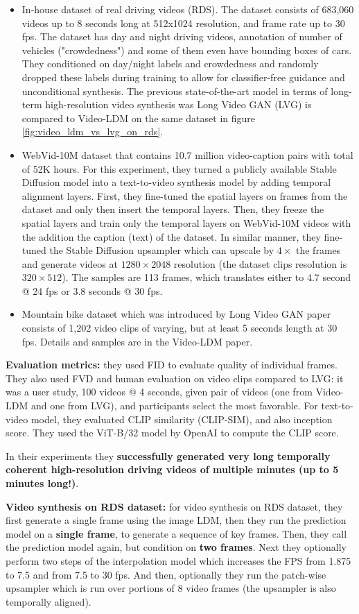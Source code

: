 \begin{itemize}
    \item In-house dataset of real driving videos (RDS). The dataset consists of 683,060 videos up to 8 seconds long at 512x1024 resolution, and frame rate up to 30 fps. The dataset has day and night driving videos, annotation of number of vehicles ("crowdedness") and some of them even have bounding boxes of cars. They conditioned on day/night labels and crowdedness and randomly dropped these labels during training to allow for classifier-free guidance and unconditional synthesis. The previous state-of-the-art model in terms of long-term high-resolution video synthesis was Long Video GAN (LVG) \cite{brooks2022generating} is compared to Video-LDM on the same dataset in figure \ref{fig:video_ldm_vs_lvg_on_rds}.
    \item WebVid-10M dataset \cite{webvid_10m} that contains 10.7 million video-caption pairs with total of 52K hours. For this experiment, they turned a publicly available Stable Diffusion model into a text-to-video synthesis model by adding temporal alignment layers. First, they fine-tuned the spatial layers on frames from the dataset and only then insert the temporal layers. Then, they freeze the spatial layers and train only the temporal layers on WebVid-10M videos with the addition the caption (text) of the dataset. In similar manner, they fine-tuned the Stable Diffusion upsampler which can upscale by $4\times$ the frames and generate videos at $1280\times 2048$ resolution (the dataset clips resolution is $320\times 512$). The samples are 113 frames, which translates either to 4.7 second @ 24 fps or 3.8 seconds @ 30 fps.
    \item Mountain bike dataset \cite{brooks2022generating} which was introduced by Long Video GAN paper consists of 1,202 video clips of varying, but at least 5 seconds length at 30 fps. Details and samples are in the Video-LDM paper.
\end{itemize}

\textbf{Evaluation metrics: } they used FID to evaluate quality of individual frames. They also used FVD and human evaluation on video clips compared to LVG: it was a user study, 100 videos @ 4 seconds, given pair of videos (one from Video-LDM and one from LVG), and participants select the most favorable. For text-to-video model, they evaluated CLIP similarity (CLIP-SIM), and also inception score. They used the ViT-B/32 \cite{openai_clip} model by OpenAI to compute the CLIP score.

In their experiments they \textbf{successfully generated very long temporally coherent high-resolution driving videos of multiple minutes (up to 5 minutes long!)}.

\textbf{Video synthesis on RDS dataset: } for video synthesis on RDS dataset, they first generate a single frame using the image LDM, then they run the prediction model on a \textbf{single frame}, to generate a sequence of key frames. Then, they call the prediction model again, but condition on \textbf{two frames}. Next they optionally perform two steps of the interpolation model which increases the FPS from 1.875 to 7.5 and from 7.5 to 30 fps. And then, optionally they run the patch-wise upsampler which is run over portions of 8 video frames (the upsampler is also temporally aligned).
